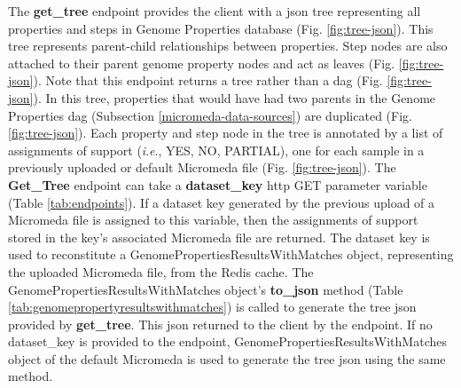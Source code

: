 The \textbf{get\_tree} endpoint provides the client with a \gls{json} tree 
representing all properties and steps in Genome Properties database (Fig. 
\ref{fig:tree-json}). This tree represents parent-child relationships between 
properties. Step nodes are also attached to their parent genome property nodes 
and act as leaves (Fig. \ref{fig:tree-json}). Note that this endpoint returns a 
tree rather than a \gls{dag} (Fig. \ref{fig:tree-json}). In this tree, 
properties that would have had two parents in the Genome Properties \gls{dag} 
(Subsection \ref{micromeda-data-sources}) are duplicated (Fig. 
\ref{fig:tree-json}). Each property and step node in the tree is annotated by a 
list of assignments of support (\textit{i}.\textit{e}., YES, NO, PARTIAL), one 
for each sample in a previously uploaded or default Micromeda file (Fig. 
\ref{fig:tree-json}). The \textbf{Get\_Tree} endpoint can take a 
\textbf{dataset\_key} \gls{http} GET parameter variable (Table 
\ref{tab:endpoints}). If a dataset key generated by the previous upload of a 
Micromeda file is assigned to this variable, then the assignments of support 
stored in the key's associated Micromeda file are returned. The dataset key is 
used to reconstitute a GenomePropertiesResultsWithMatches object, representing 
the uploaded Micromeda file, from the Redis cache. The 
GenomePropertiesResultsWithMatches object's \textbf{to\_json} method (Table 
\ref{tab:genomepropertyresultswithmatches}) is called to generate the tree 
\gls{json} provided by \textbf{get\_tree}. This \gls{json} returned to the 
client by the endpoint. If no dataset\_key is provided to the endpoint, 
GenomePropertiesResultsWithMatches object of the default Micromeda is used to 
generate the tree \gls{json} using the same method.

